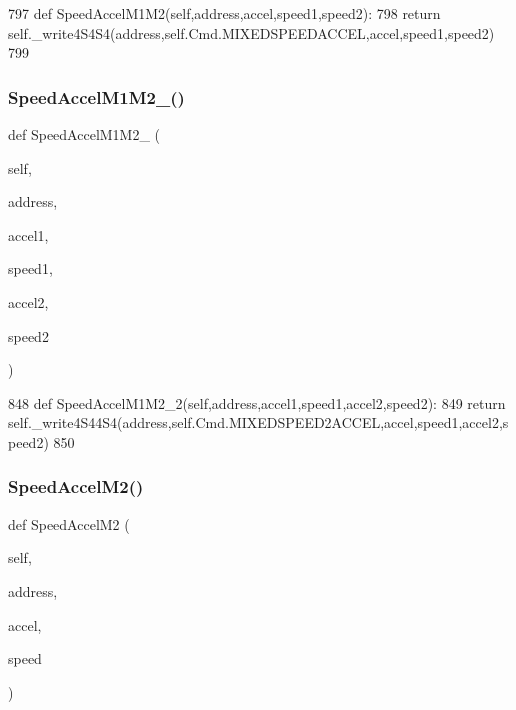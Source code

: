 \begin{DoxyCode}
797     \textcolor{keyword}{def }SpeedAccelM1M2(self,address,accel,speed1,speed2):
798         \textcolor{keywordflow}{return} self.\_write4S4S4(address,self.Cmd.MIXEDSPEEDACCEL,accel,speed1,speed2)
799 
\end{DoxyCode}
\mbox{\label{classtoxic__hardware_1_1roboclaw__3_1_1Roboclaw_ab9eb6d09f652e887dd9d6b8d1300d919}} 
\subsubsection{\texorpdfstring{Speed\+Accel\+M1\+M2\+\_()}{SpeedAccelM1M2\_2()}}
{\footnotesize\ttfamily def Speed\+Accel\+M1\+M2\+\_ (\begin{DoxyParamCaption}\item[{}]{self,  }\item[{}]{address,  }\item[{}]{accel1,  }\item[{}]{speed1,  }\item[{}]{accel2,  }\item[{}]{speed2 }\end{DoxyParamCaption})}


\begin{DoxyCode}
848     \textcolor{keyword}{def }SpeedAccelM1M2\_2(self,address,accel1,speed1,accel2,speed2):
849         \textcolor{keywordflow}{return} self.\_write4S44S4(address,self.Cmd.MIXEDSPEED2ACCEL,accel,speed1,accel2,speed2)
850 
\end{DoxyCode}
\mbox{\label{classtoxic__hardware_1_1roboclaw__3_1_1Roboclaw_ac9b5288bf09d899fb2891fa4a1cb5326}} 
\subsubsection{\texorpdfstring{Speed\+Accel\+M2()}{SpeedAccelM2()}}
{\footnotesize\ttfamily def Speed\+Accel\+M2 (\begin{DoxyParamCaption}\item[{}]{self,  }\item[{}]{address,  }\item[{}]{accel,  }\item[{}]{speed }\end{DoxyParamCaption})}


